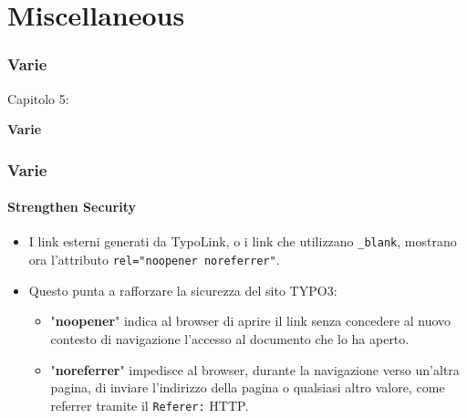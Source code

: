 %

\section{Miscellaneous}
\begin{frame}[fragile]
	\frametitle{Varie}

	\begin{center}\huge{Capitolo 5:}\end{center}
	\begin{center}\huge{\color{typo3darkgrey}\textbf{Varie}}\end{center}

\end{frame}


\begin{frame}[fragile]
	\frametitle{Varie}
	\framesubtitle{Strengthen Security}

	\begin{itemize}
		\item I link esterni generati da TypoLink, o i link che utilizzano \texttt{\_blank},
			mostrano ora l'attributo \texttt{rel="noopener noreferrer"}.
		\item Questo punta a rafforzare la sicurezza del sito TYPO3:

			\begin{itemize}
				\item "\textbf{noopener}" indica al browser di aprire il link senza concedere
					al nuovo contesto di navigazione l'accesso al documento che lo ha aperto.
				\item "\textbf{noreferrer}" impedisce al browser, durante la navigazione verso un'altra pagina,
					di inviare l'indirizzo della pagina o  qualsiasi altro valore, come referrer tramite il
					\texttt{Referer:} HTTP.
			\end{itemize}

	\end{itemize}

\end{frame}

